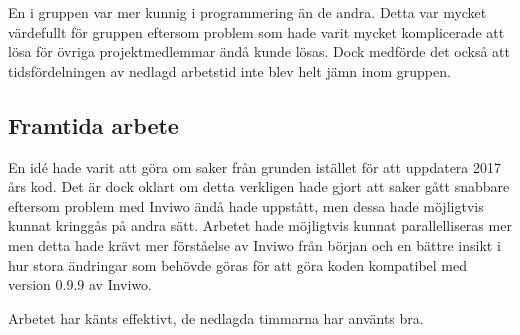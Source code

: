\documentclass[a4paper,12pt]{article}
\begin{document}
En i gruppen var mer kunnig i programmering än de andra. Detta var mycket värdefullt för gruppen eftersom problem som hade varit mycket komplicerade att lösa för övriga projektmedlemmar ändå kunde lösas. Dock medförde det också att tidsfördelningen av nedlagd arbetstid inte blev helt jämn inom gruppen.  

\subsection{Framtida arbete}
En idé hade varit att göra om saker från grunden istället för att uppdatera 2017 års kod. Det är dock oklart om detta verkligen hade gjort att saker gått snabbare eftersom problem med Inviwo ändå hade uppstått, men dessa hade möjligtvis kunnat kringgås på andra sätt. Arbetet hade möjligtvis kunnat parallelliseras mer men detta hade krävt mer förståelse av Inviwo från början och en bättre insikt i hur stora ändringar som behövde göras för att göra koden kompatibel med version 0.9.9 av Inviwo.  

Arbetet har känts effektivt, de nedlagda timmarna har använts bra. 



\newpage
{}
\printbibliography{}
\end{document}
